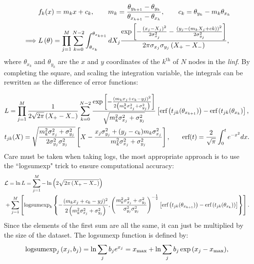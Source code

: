 \documentclass{article}
\begin{document}
\begin{equation}
\begin{aligned}
  & f_k(x) = m_k x + c_k, \qquad m_k = \frac{\theta_{y_{k+1}} - \theta_{y_k}}{\theta_{x_{k+1}} - \theta_{x_k}}, \qquad c_k = \theta_{y_k} - m_k \theta_{x_k} \\
  \implies & L\left(\mathbf{\theta}\right) =
  \prod_{j=1}^{M}\sum_{k=0}^{N-2}\int_{\theta_{x_k}}^{\theta_{x_{k+1}}}dX_j\frac{\exp{\left[-\frac{\left(x_j-X_j\right)^2}{2\sigma_{x_j}^2} -\frac{\left(y_j-\left(m_kX_j+ck\right)\right)^2}{2\sigma_{y_j}^2}\right]}}{2\pi\sigma_{x_j}\sigma_{y_j}\left(X_+-X_-\right)}\textrm,
\end{aligned}
\end{equation}
%
where $\theta_{x_k}$ and $\theta_{y_k}$ are the $x$ and $y$ coordinates of the $k^\textrm{th}$ of $N$ nodes in the \textit{linf}. By completing the square, and scaling the integration variable, the integrals can be rewritten as the difference of error functions:

\begin{equation}
\begin{aligned}
  & L = \prod_{j=1}^{M}\frac{1}{2\sqrt{2\pi}\left(X_+-X_-\right)}\sum_{k=0}^{N-2}
  \frac{\exp{\left[-\frac{(m_kx_j+c_k - yj)^2}{2\left(m_k^2\sigma_{x_j}^2+\sigma_{y_j}^2\right)}\right]}}
  {\sqrt{m_k^2\sigma_{x_j}^2+\sigma_{y_j}^2}}
  \left[\textrm{erf}\left(t_{jk}(\theta_{x_{k+1}})\right) - \textrm{erf}\left(t_{jk}(\theta_{x_k}\right)\right]\textrm, 
  \\
  & t_{jk}(X) = \sqrt{\frac{m_k^2\sigma_{x_j}^2+\sigma_{y_j}^2}{2\sigma_{y_j}^2\sigma_{y_j}^2}}
  \left[X - \frac{x_j\sigma_{y_j}^2 + (y_j-c_k)m_k\sigma_{x_j}^2}{m_k^2\sigma_{x_j}^2+\sigma_{y_j}^2}\right]\textrm, \qquad \textrm{erf}(t) = \frac{2}{\sqrt{\pi}}\int_0^t e^{-x^2}dx\textrm.
\end{aligned}
\end{equation}
%
Care must be taken when taking logs, the most appropriate approach is to use the ``logsumexp" trick to ensure computational accuracy:
%
\begin{equation}
\begin{aligned}
  &\mathcal{L} = \ln{L} = \sum_{j=1}^{M} -\ln{\left(2\sqrt{2\pi\left(X_+-X_-\right)}\right)}\\
  &+ \sum_{j=1}^{M} \left[\textrm{logsumexp}_k\left\{
  -\frac{(m_kx_j+c_k - yj)^2}{2\left(m_k^2\sigma_{x_j}^2+\sigma_{y_j}^2\right)}
  \textrm, 
  \left(\frac{m_k^2\sigma_{x_j}^2+\sigma_{y_j}^2}{\sigma_{y_j}^2\sigma_{y_j}^2}\right)^{-\frac{1}{2}}
  \left[\textrm{erf}\left(t_{jk}(\theta_{x_{k+1}})\right) - \textrm{erf}\left(t_{jk}(\theta_{x_k})\right)\right]
  \right\}
  \right]\textrm.
\end{aligned}
\end{equation}
%
Since the elements of the first sum are all the same, it can just be multiplied by the size of the dataset. The logsumexp function is defined by:
\begin{equation}
  \textrm{logsumexp}_j\left(x_j, b_j\right) = \ln{\sum_j b_j e^{x_j}}= x_\textrm{max} + \ln{\sum_j b_j \exp{\left(x_j-x_\textrm{max}\right)}} \textrm,
  \label{eq:logsumexp}
\end{equation}
\end{document}
